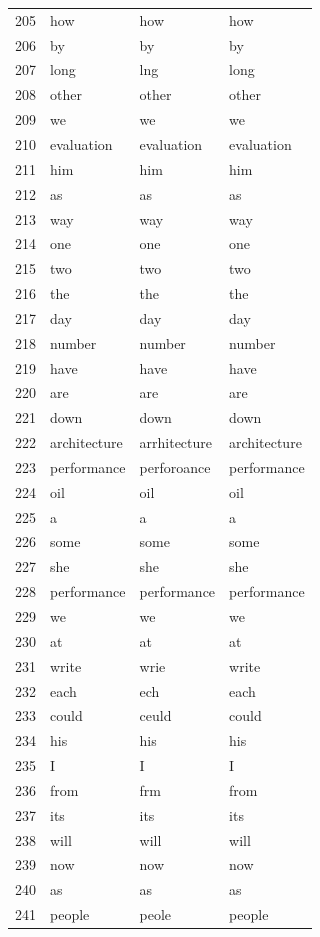 \begin{longtable}{clll}
    205 & how & how & how \\
    206 & by & by & by \\
    207 & long & lng & long \\
    208 & other & other & other \\
    209 & we & we & we \\
    210 & evaluation & evaluation & evaluation \\
    211 & him & him & him \\
    212 & as & as & as \\
    213 & way & way & way \\
    214 & one & one & one \\
    215 & two & two & two \\
    216 & the & the & the \\
    217 & day & day & day \\
    218 & number & number & number \\
    219 & have & have & have \\
    220 & are & are & are \\
    221 & down & down & down \\
    222 & architecture & arrhitecture & architecture \\
    223 & performance & perforoance & performance \\
    224 & oil & oil & oil \\
    225 & a & a & a \\
    226 & some & some & some \\
    227 & she & she & she \\
    228 & performance & performance & performance \\
    229 & we & we & we \\
    230 & at & at & at \\
    231 & write & wrie & write \\
    232 & each & ech & each \\
    233 & could & ceuld & could \\
    234 & his & his & his \\
    235 & I & I & I \\
    236 & from & frm & from \\
    237 & its & its & its \\
    238 & will & will & will \\
    239 & now & now & now \\
    240 & as & as & as \\
    241 & people & peole & people \\

\end{longtable}

